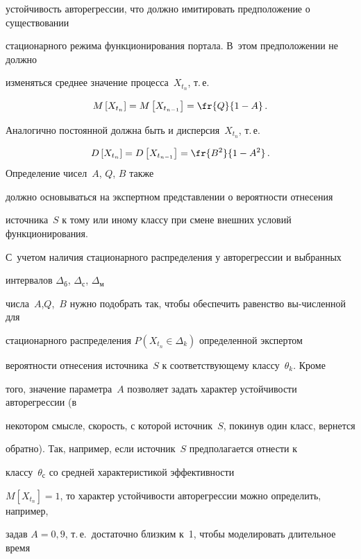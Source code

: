 устойчивость авторегрессии, что должно имитировать предположение о существовании 


стационарного режима функционирования портала. В~этом предположении не должно 


изменяться среднее значение процесса~$X_{t_n}$, т.\,е.


$$


M


\left[X_{t_n}\right]=M\left[X_{t_{n- 1}}\right]=\fr{Q}{1-A}\,.


$$


Аналогично постоянной должна быть и дисперсия~$X_{t_n}$, т.\,е.\ 


$$


D\left[X_{t_n}\right]=D\left[X_{t_{n-1}}\right]=\fr{B^2}{1-A^2}\,.


$$Определение чисел~$A$, $Q$, $B$ также 


должно основываться на экспертном представлении о вероятности отнесения 


источника~$S$ к тому или иному классу при смене внешних условий функционирования. 


С~учетом наличия стационарного распределения у авторегрессии и выбранных 


интервалов $\Delta_{\mathrm{б}}$, $\Delta_{\mathrm{с}}$, $\Delta_{\mathrm{м}}$ 


числа~$A$,\linebreak $Q$,~$B$ нужно подобрать так, чтобы обеспечить равенство вы-\linebreak численной для 


стационарного распределения $P(X_{t_n}\in \Delta_k)$ определенной экспертом 


вероятности отнесения источника~$S$ к соответствующему классу~$\theta_k$. Кроме 


того, значение параметра~$A$ позволяет задать характер устойчивости авторегрессии (в 


некотором смысле, скорость, с которой источник~$S$, покинув один класс, вернется 


обратно). Так, например, если источник~$S$ предполагается отнести к 


классу~$\theta_{\mathrm{с}}$ со средней характеристикой эффективности 


$M[X_{t_n}]=1$, то характер устойчивости авторегрессии можно  определить, например, 


задав $A=0{,}9$, т.\,е.\ достаточно близким к~1, чтобы моделировать длительное время 


